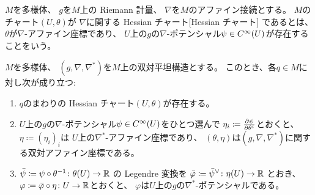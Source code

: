 \documentclass[report]{jlreq}
\begin{document}
\begin{definition}
    $M$を多様体、
    $g$を$M$上の Riemann 計量、
    $\nabla$を$M$のアファイン接続とする。
    $M$のチャート$(U, \theta)$が
    $\nabla$に関する
        {Hessian チャート}[Hessian チャート]
    であるとは、
    $\theta$が$\nabla$-アファイン座標であり、
    $U$上の$g$の$\nabla$-ポテンシャル$\psi \in C^\infty(U)$が存在することをいう。
\end{definition}

\begin{theorem}
    $M$を多様体、
    $(g, \nabla, \nabla^*)$を$M$上の双対平坦構造とする。
    このとき、各$q \in M$に対し次が成り立つ:
    \begin{enumerate}
        \item $q$のまわりの Hessian チャート$(U, \theta)$が存在する。
        \item $U$上の$g$の$\nabla$-ポテンシャル$\psi \in C^\infty(U)$をひとつ選んで
            $\eta_i \coloneqq \deldel[\psi]{\theta^i}$とおくと、
            $\eta \coloneqq (\eta_i)_i$は
            $U$上の$\nabla^*$-アファイン座標であり、
            $(\theta, \eta)$は$(g, \nabla, \nabla^*)$に関する双対アファイン座標である。
        \item $\bar{\psi} \coloneqq \psi \circ \theta^{-1} \colon \theta(U) \to \mathbb{R}$
            の Legendre 変換を
            $\bar{\varphi} \coloneqq \bar{\psi}^\vee \colon \eta(U) \to \mathbb{R}$
            とおき、
            $\varphi \coloneqq \bar{\varphi} \circ \eta \colon U \to \mathbb{R}$とおくと、
            $\varphi$は$U$上の$g$の$\nabla^*$-ポテンシャルである。
    \end{enumerate}
\end{theorem}
\end{document}
